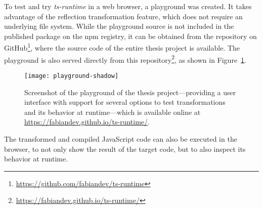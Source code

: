To test and try \emph{ts-runtime} in a web browser, a playground was created. It takes advantage of the reflection transformation feature, which does not require an underlying file system. While the playground source is not included in the published package on the npm registry, it can be obtained from the repository on GitHub\footnote{\url{https://github.com/fabiandev/ts-runtime}}, where the source code of the entire thesis project is available. The playground is also served directly from this repository\footnote{\url{https://fabiandev.github.io/ts-runtime/}}, as shown in Figure~\ref{fig:playground}.
\begin{figure}
\centering
\texttt{[image: playground-shadow]}
\caption{Screenshot of the playground of the thesis project---providing a user interface with support for several options to test transformations and its behavior at runtime---which is available online at \url{https://fabiandev.github.io/ts-runtime/}.}
\label{fig:playground}
\end{figure}
The transformed and compiled JavaScript code can also be executed in the browser, to not only show the result of the target code, but to also inspect its behavior at runtime.
